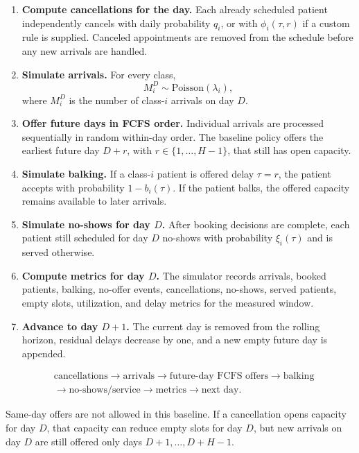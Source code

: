 \documentclass[11pt]{article}
\begin{document}
\begin{enumerate}[itemsep=0.35em]
    \item \textbf{Compute cancellations for the day.} Each already scheduled patient independently cancels with daily probability \(q_i\), or with \(\phi_i(\tau,r)\) if a custom rule is supplied. Canceled appointments are removed from the schedule before any new arrivals are handled.
    \item \textbf{Simulate arrivals.} For every class,
    \[
    M_i^D \sim \mathrm{Poisson}(\lambda_i),
    \]
    where \(M_i^D\) is the number of class-\(i\) arrivals on day \(D\).
    \item \textbf{Offer future days in FCFS order.} Individual arrivals are processed sequentially in random within-day order. The baseline policy offers the earliest future day \(D+r\), with \(r\in\{1,\dots,H-1\}\), that still has open capacity.
    \item \textbf{Simulate balking.} If a class-\(i\) patient is offered delay \(\tau=r\), the patient accepts with probability \(1-b_i(\tau)\). If the patient balks, the offered capacity remains available to later arrivals.
    \item \textbf{Simulate no-shows for day \(D\).} After booking decisions are complete, each patient still scheduled for day \(D\) no-shows with probability \(\xi_i(\tau)\) and is served otherwise.
    \item \textbf{Compute metrics for day \(D\).} The simulator records arrivals, booked patients, balking, no-offer events, cancellations, no-shows, served patients, empty slots, utilization, and delay metrics for the measured window.
    \item \textbf{Advance to day \(D+1\).} The current day is removed from the rolling horizon, residual delays decrease by one, and a new empty future day is appended.
\end{enumerate}

\begin{keybox}[title={Event Order}]
\begin{align*}
&\text{cancellations}
\rightarrow
\text{arrivals}
\rightarrow
\text{future-day FCFS offers}
\rightarrow
\text{balking}\\
&\rightarrow
\text{no-shows/service}
\rightarrow
\text{metrics}
\rightarrow
\text{next day}.
\end{align*}
\end{keybox}

Same-day offers are not allowed in this baseline. If a cancellation opens capacity for day \(D\),
that capacity can reduce empty slots for day \(D\), but new arrivals on day \(D\) are still offered
only days \(D+1,\dots,D+H-1\).
\end{document}
